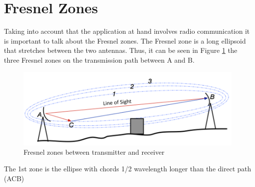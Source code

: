 \section{Fresnel Zones}\label{sec:fresnel}
Taking into account that the application at hand involves radio communication it is important to talk about the Fresnel zones. The Fresnel zone is a long ellipsoid that stretches between the two antennas. Thus, it can be seen in Figure \ref{fig:fresnel_zones} the three Fresnel zones on the transmission path between A and B. 

\begin{figure}[h]
	\centering
	\includegraphics[scale=0.65]{figures/fresnel_zones.png}
	\caption{Fresnel zones between transmitter and receiver}
	\label{fig:fresnel_zones}
\end{figure}


The 1st zone is the ellipse with chords 1/2 wavelength longer than the direct path (ACB)

